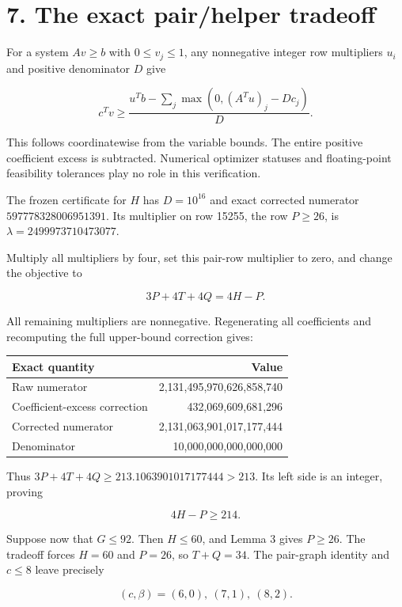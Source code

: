 \hypertarget{the-exact-pairhelper-tradeoff}{%
\section{7. The exact pair/helper tradeoff}\label{the-exact-pairhelper-tradeoff}}

For a system \(Av\geq b\) with \(0\leq v_j\leq1\), any nonnegative integer row multipliers \(u_i\) and positive denominator \(D\) give

\[c^Tv\geq\frac{u^Tb-\sum_j\max(0,(A^Tu)_j-Dc_j)}{D}.\]

This follows coordinatewise from the variable bounds. The entire positive coefficient excess is subtracted. Numerical optimizer statuses and floating-point feasibility tolerances play no role in this verification.

The frozen certificate for \(H\) has \(D=10^{16}\) and exact corrected numerator \(597778328006951391\). Its multiplier on row 15255, the row \(P\geq26\), is \(\lambda=2499973710473077\).

Multiply all multipliers by four, set this pair-row multiplier to zero, and change the objective to

\[3P+4T+4Q=4H-P.\]

All remaining multipliers are nonnegative. Regenerating all coefficients and recomputing the full upper-bound correction gives:

\begin{longtable}[]{@{}lr@{}}
\toprule\noalign{}
Exact quantity & Value \\
\midrule\noalign{}
\endhead
\bottomrule\noalign{}
\endlastfoot
Raw numerator & 2,131,495,970,626,858,740 \\
Coefficient-excess correction & 432,069,609,681,296 \\
Corrected numerator & 2,131,063,901,017,177,444 \\
Denominator & 10,000,000,000,000,000 \\
\end{longtable}

Thus \(3P+4T+4Q\geq213.1063901017177444>213\). Its left side is an integer, proving

\[\boxed{4H-P\geq214.}\]

Suppose now that \(G\leq92\). Then \(H\leq60\), and Lemma 3 gives \(P\geq26\). The tradeoff forces \(H=60\) and \(P=26\), so \(T+Q=34\). The pair-graph identity and \(c\leq8\) leave precisely

\[ (c,\beta)=(6,0),\ (7,1),\ (8,2).\]

